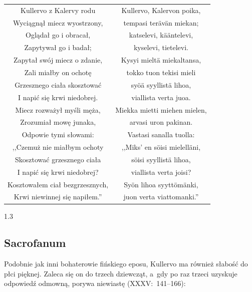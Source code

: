 \documentclass[11pt,a4paper,twoside]{report}
\begin{document}
{\centering
\small
\begin{longtable}{c c}
Kullervo z Kalervy rodu & Kullervo, Kalervon poika, \\
Wyciągnął miecz wyostrzony, & tempasi terävän miekan; \\
Oglądał go i obracał, & katselevi, kääntelevi, \\
Zapytywał go i badał; & kyselevi, tietelevi. \\
Zapytał swój miecz o zdanie, & Kysyi mieltä miekaltansa, \\
Zali miałby on ochotę & tokko tuon tekisi mieli \\
Grzesznego ciała skosztować & syöä syyllistä lihoa, \\
I napić się krwi niedobrej. & viallista verta juoa. \\
Miecz rozważył myśli męża, & Miekka mietti miehen mielen, \\
Zrozumiał mowę junaka, & arvasi uron pakinan. \\
Odpowie tymi słowami: & Vastasi sanalla tuolla: \\
,,Czemuż nie miałbym ochoty & ,,Miks' en söisi mielelläni, \\
Skosztować grzesznego ciała & söisi syyllistä lihoa, \\
I napić się krwi niedobrej? & viallista verta joisi? \\
Kosztowałem ciał bezgrzesznych, & Syön lihoa syyttömänki, \\
Krwi niewinnej się napiłem.'' & juon verta viattomanki.'' \\
\end{longtable}
}
\begin{spacing}{1.3}
\vspace*{0.5\baselineskip}
\subsection*{Sacrofanum}

Podobnie jak inni bohaterowie fińskiego eposu, Kullervo ma również słabość do płci pięknej. Zaleca się on do trzech dziewcząt, a~gdy po raz trzeci uzyskuje odpowiedź odmowną, porywa niewiastę (XXXV:~141--166):
\end{spacing}
\end{document}
